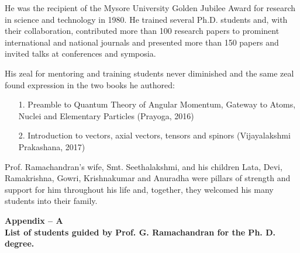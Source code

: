 He was the recipient of the Mysore University Golden Jubilee Award for research in science and technology in 1980. He trained several Ph.D. students and, with their collaboration, contributed more than 100 research papers to prominent international and national journals and presented more than 150 papers and invited talks at conferences and symposia.

His zeal for mentoring and training students never diminished and the same zeal found expression in the two books he authored:
\begin{enumerate}
\item[1.] Preamble to Quantum Theory of Angular Momentum, Gateway to Atoms, Nuclei and Elementary Particles (Prayoga, 2016)

\item[2.] Introduction to vectors, axial vectors, tensors and spinors (Vijayalakshmi Prakashana, 2017)
\end{enumerate}

Prof. Ramachandran's wife, Smt. Seethalakshmi, and his children Lata, Devi, Ramakrishna, Gowri, Krishnakumar and Anuradha were pillars of strength and support for him throughout his life and, together, they welcomed his many students into their family.

\eject

\begin{center}
\textbf{Appendix -- A}\\[4pt]
\textbf{List of students guided by Prof. G. Ramachandran for the Ph. D. degree.}
\end{center}


